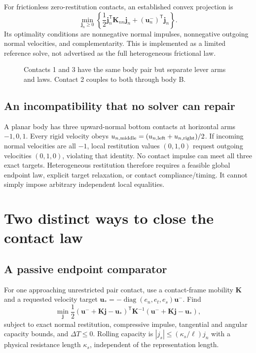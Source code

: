 \documentclass[11pt,a4paper]{article}
\newcommand{\bv}[1]{\bm{#1}}\newcommand{\inertia}{\mathbb I}
\begin{document}
For frictionless zero-restitution contacts, an established convex projection is
\begin{equation}
\min_{\bv j_n\geq0}\left\{\frac12\bv j_n^{\mathsf T}\bv K_{nn}\bv j_n+(\bv u_n^-)^{\mathsf T}\bv j_n\right\}.
\end{equation}
Its optimality conditions are nonnegative normal impulses, nonnegative outgoing normal velocities, and complementarity. This is implemented as a limited reference solve, not advertised as the full heterogeneous frictional law.

\begin{figure}[ht]\centering
{}
\caption{Contacts 1 and 3 have the same body pair but separate lever arms and laws. Contact 2 couples to both through body B.}
\end{figure}

\subsection{An incompatibility that no solver can repair}
A planar body has three upward-normal bottom contacts at horizontal arms $-1,0,1$. Every rigid velocity obeys $u_{n,\rm middle}=(u_{n,\rm left}+u_{n,\rm right})/2$. If incoming normal velocities are all $-1$, local restitution values $(0,1,0)$ request outgoing velocities $(0,1,0)$, violating that identity. No contact impulse can meet all three exact targets. Heterogeneous restitution therefore requires a feasible global endpoint law, explicit target relaxation, or contact compliance/timing. It cannot simply impose arbitrary independent local equalities.

\section{Two distinct ways to close the contact law}
\subsection{A passive endpoint comparator}
For one approaching unrestricted pair contact, use a contact-frame mobility $\bv K$ and a requested velocity target $\bv u_*=-\operatorname{diag}(e_n,e_t,e_s)\bv u^-$. Find
\begin{equation}
\min_{\bv j}\frac12(\bv u^-+\bv K\bv j-\bv u_*)^{\mathsf T}\bv K^{-1}
(\bv u^-+\bv K\bv j-\bv u_*),
\end{equation}
subject to exact normal restitution, compressive impulse, tangential and angular capacity bounds, and $\Delta T\leq0$. Rolling capacity is $|j_s|\leq(\kappa_s/\ell)j_n$ with a physical resistance length $\kappa_s$, independent of the representation length.
\end{document}
